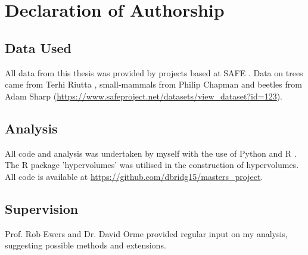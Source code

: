 \clearpage

\section*{Declaration of Authorship}

\subsection*{Data Used}

All data from this thesis was provided by projects based at SAFE \citep{Ewers2011}. Data on trees came from Terhi Riutta \citep{Riutta2018}, small-mammals from Philip Chapman \cite{Chapman2018} and beetles from Adam Sharp (\url{https://www.safeproject.net/datasets/view_dataset?id=123}).

\subsection*{Analysis}

All code and analysis was undertaken by myself with the use of Python and R \citep{RCoreTeam2017}. The R package 'hypervolumes' \citep{Blonder2017a} was utilised in the construction of hypervolumes. All code is available at \url{https://github.com/dbridg15/masters_project}.

\subsection*{Supervision}

Prof. Rob Ewers and Dr. David Orme provided regular input on my analysis, suggesting possible methods and extensions.